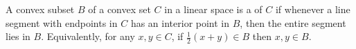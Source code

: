 A convex subset $B$ of a convex set $C$ in a linear space is a  of $C$ if whenever a line segment with endpoints in $C$ has an interior point in $B$, then the entire segment lies in $B$. Equivalently, for any $x, y \in C$, if $\frac{1}{2}(x + y) \in B$ then $x, y \in B$.
